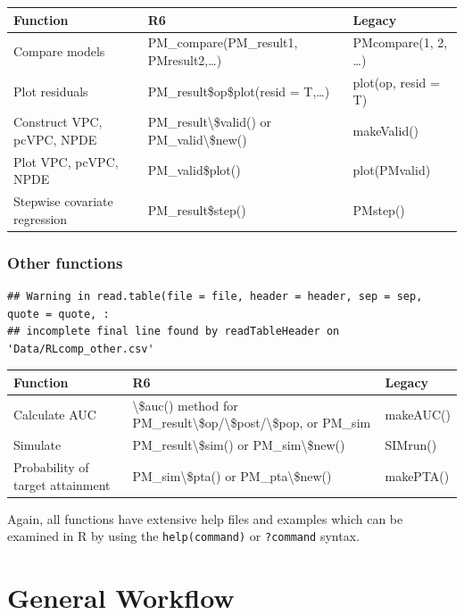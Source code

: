 \documentclass[
]{book}
\begin{document}
\begin{tabular}{l|l|l}
\hline
Function & R6 & Legacy\\
\hline
Compare models & PM\_compare(PM\_result1, PMresult2,…) & PMcompare(1, 2, …)\\
\hline
Plot residuals & PM\_result\$op\$plot(resid = T,…) & plot(op, resid = T)\\
\hline
Construct VPC, pcVPC, NPDE & PM\_result\textbackslash{}\$valid() or PM\_valid\textbackslash{}\$new() & makeValid()\\
\hline
Plot VPC, pcVPC, NPDE & PM\_valid\$plot() & plot(PMvalid)\\
\hline
Stepwise covariate regression & PM\_result\$step() & PMstep()\\
\hline
\end{tabular}

\hypertarget{other-functions-1}{%
\subsection{Other functions}\label{other-functions-1}}

\begin{verbatim}
## Warning in read.table(file = file, header = header, sep = sep, quote = quote, :
## incomplete final line found by readTableHeader on 'Data/RLcomp_other.csv'
\end{verbatim}

\begin{tabular}{l|l|l}
\hline
Function & R6 & Legacy\\
\hline
Calculate AUC & \textbackslash{}\$auc() method for PM\_result\textbackslash{}\$op/\textbackslash{}\$post/\textbackslash{}\$pop, or PM\_sim & makeAUC()\\
\hline
Simulate & PM\_result\textbackslash{}\$sim() or PM\_sim\textbackslash{}\$new() & SIMrun()\\
\hline
Probability of target attainment & PM\_sim\textbackslash{}\$pta() or PM\_pta\textbackslash{}\$new() & makePTA()\\
\hline
\end{tabular}

Again, all functions have extensive help files and examples which can be
examined in R by using the \texttt{help(command)} or \texttt{?command} syntax.

\hypertarget{general-workflow}{%
\chapter{General Workflow}\label{general-workflow}}
\end{document}
